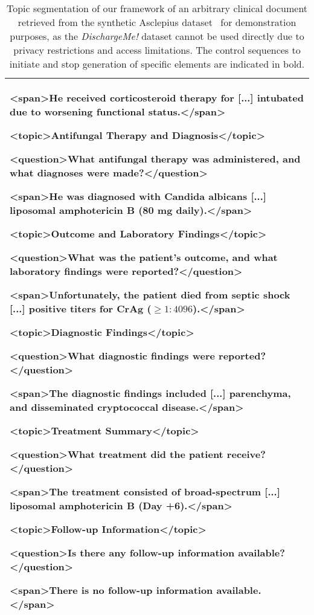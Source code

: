 \begin{table*}[ht]
{\begin{tabular}{p{\textwidth}}
\textbf{<span>}\textcolor{SeafoamGreen}{He received corticosteroid therapy for  [...] intubated due to worsening functional status.}\textbf{</span>}

\textbf{<topic>}Antifungal Therapy and Diagnosis\textbf{</topic>}

\textbf{<question>}What antifungal therapy was administered, and what diagnoses were made?\textbf{</question>}

\textbf{<span>}\textcolor{DustyBlue}{He was diagnosed with Candida albicans [...] liposomal amphotericin B (80 mg daily).}\textbf{</span>}

\textbf{<topic>}Outcome and Laboratory Findings\textbf{</topic>}

\textbf{<question>}What was the patient's outcome, and what laboratory findings were reported?\textbf{</question>}

\textbf{<span>}\textcolor{GoldenSand}{Unfortunately, the patient died from septic shock [...] positive titers for CrAg ($\geq 1:4096$).}\textbf{</span>}

\textbf{<topic>}Diagnostic Findings\textbf{</topic>}

\textbf{<question>}What diagnostic findings were reported?\textbf{</question>}

\textbf{<span>}\textcolor{BlushPink}{The diagnostic findings included [...] parenchyma, and disseminated cryptococcal disease.}\textbf{</span>}

\textbf{<topic>}Treatment Summary\textbf{</topic>}

\textbf{<question>}What treatment did the patient receive?\textbf{</question>}

\textbf{<span>}\textcolor{TealBreeze}{The treatment consisted of broad-spectrum [...] liposomal amphotericin B (Day +6).}\textbf{</span>}

\textbf{<topic>}Follow-up Information\textbf{</topic>}

\textbf{<question>}Is there any follow-up information available?\textbf{</question>}

\textbf{<span>}\textcolor{MistyLavender}{There is no follow-up information available.}\textbf{</span>}\\
\hline
\end{tabular}
}

\caption{Topic segmentation of our framework of an arbitrary clinical document retrieved from the synthetic Asclepius dataset~\cite{kweon-etal-2024-publicly} for demonstration purposes, as the \textit{DischargeMe!} dataset cannot be used directly due to privacy restrictions and access limitations. The control sequences to initiate and stop generation of specific elements are indicated in bold.}
\label{table:topic_segmentation_annotation_example}
\end{table*}



